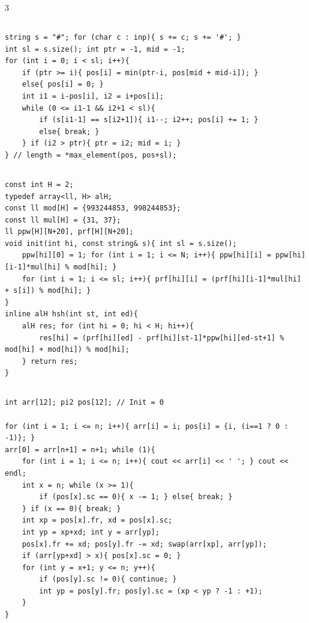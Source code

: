 \documentclass[landscape, 8pt, a4paper, oneside]{extarticle}
\begin{document}
\begin{multicols*}{3}
\subsection{}
\begin{verbatim}
string s = "#"; for (char c : inp){ s += c; s += '#'; }
int sl = s.size(); int ptr = -1, mid = -1;
for (int i = 0; i < sl; i++){
	if (ptr >= i){ pos[i] = min(ptr-i, pos[mid + mid-i]); }
	else{ pos[i] = 0; }
	int i1 = i-pos[i], i2 = i+pos[i];
	while (0 <= i1-1 && i2+1 < sl){
		if (s[i1-1] == s[i2+1]){ i1--; i2++; pos[i] += 1; }
		else{ break; }
	} if (i2 > ptr){ ptr = i2; mid = i; }
} // length = *max_element(pos, pos+sl);
\end{verbatim}
\subsection{}
\begin{verbatim}
const int H = 2;
typedef array<ll, H> alH;
const ll mod[H] = {993244853, 998244853};
const ll mul[H] = {31, 37};
ll ppw[H][N+20], prf[H][N+20];
void init(int hi, const string& s){ int sl = s.size();
	ppw[hi][0] = 1; for (int i = 1; i <= N; i++){ ppw[hi][i] = ppw[hi][i-1]*mul[hi] % mod[hi]; }
	for (int i = 1; i <= sl; i++){ prf[hi][i] = (prf[hi][i-1]*mul[hi] + s[i]) % mod[hi]; }
}
inline alH hsh(int st, int ed){
	alH res; for (int hi = 0; hi < H; hi++){
		res[hi] = (prf[hi][ed] - prf[hi][st-1]*ppw[hi][ed-st+1] % mod[hi] + mod[hi]) % mod[hi];
	} return res;
}
\end{verbatim}
\subsection{}
\begin{verbatim}
int arr[12]; pi2 pos[12]; // Init = 0

for (int i = 1; i <= n; i++){ arr[i] = i; pos[i] = {i, (i==1 ? 0 : -1)}; }
arr[0] = arr[n+1] = n+1; while (1){
	for (int i = 1; i <= n; i++){ cout << arr[i] << ' '; } cout << endl;
	int x = n; while (x >= 1){
		if (pos[x].sc == 0){ x -= 1; } else{ break; }
	} if (x == 0){ break; }
	int xp = pos[x].fr, xd = pos[x].sc;
	int yp = xp+xd; int y = arr[yp];
	pos[x].fr += xd; pos[y].fr -= xd; swap(arr[xp], arr[yp]);
	if (arr[yp+xd] > x){ pos[x].sc = 0; }
	for (int y = x+1; y <= n; y++){
		if (pos[y].sc != 0){ continue; }
		int yp = pos[y].fr; pos[y].sc = (xp < yp ? -1 : +1);
	}
}
\end{verbatim}

\end{multicols*}
\end{document}
